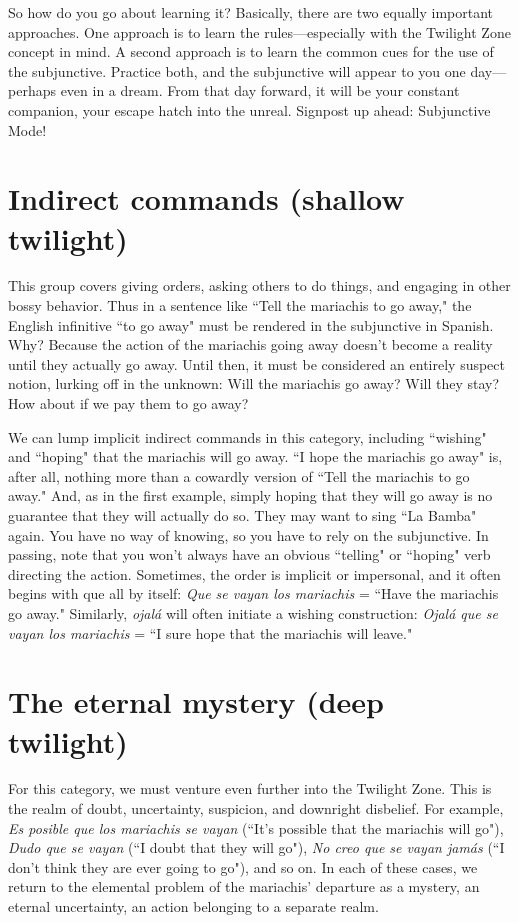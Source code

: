 So how do you go about learning it? Basically, there are two
equally important approaches. One approach is to learn the
rules---especially with the Twilight Zone concept in mind. A second
approach is to learn the common cues for the use of the subjunctive.
Practice both, and the subjunctive will appear to you one day---perhaps
even in a dream. From that day forward, it will be your constant companion, your escape hatch into the unreal. Signpost up ahead: Subjunctive Mode!

\section{Indirect commands (shallow twilight)}

This group covers giving orders, asking others to do things,
and engaging in other bossy behavior. Thus in a sentence like ``Tell the
mariachis to go away," the English infinitive ``to go away" must be rendered in the subjunctive in Spanish. Why? Because the action of the
mariachis going away doesn't become a reality until they actually go
away. Until then, it must be considered an entirely suspect notion,
lurking off in the unknown: Will the mariachis go away? Will they
stay? How about if we pay them to go away?

We can lump implicit indirect commands in this category, including ``wishing" and ``hoping" that the mariachis will go away. ``I
hope the mariachis go away" is, after all, nothing more than a cowardly version of ``Tell the mariachis to go away." And, as in the first
example, simply hoping that they will go away is no guarantee that
they will actually do so. They may want to sing ``La Bamba" again.
You have no way of knowing, so you have to rely on the subjunctive. In
passing, note that you won't always have an obvious ``telling" or ``hoping" verb directing the action. Sometimes, the order is implicit or impersonal, and it often begins with que all by itself: \emph{Que se vayan los
mariachis} = ``Have the mariachis go away." Similarly, \emph{ojalá} will often
initiate a wishing construction: \emph{Ojalá que se vayan los mariachis} =
``I sure hope that the mariachis will leave."

\section{The eternal mystery (deep twilight)}

For this category, we must venture even further into the Twilight Zone. This is the realm of doubt, uncertainty, suspicion, and
downright disbelief. For example, \emph{Es posible que los mariachis se
vayan} (``It's possible that the mariachis will go"), \emph{Dudo que se vayan}
(``I doubt that they will go"), \emph{No creo que se vayan jamás} (``I don't
think they are ever going to go"), and so on. In each of these cases, we
return to the elemental problem of the mariachis' departure as a mystery, an eternal uncertainty, an action belonging to a separate realm.

